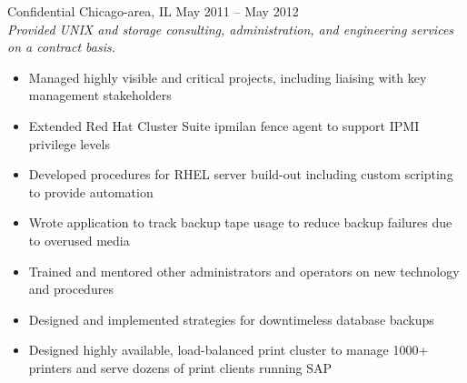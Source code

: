 \documentclass[9pt]{extarticle} %
\begin{document}
\begin{indented}
	Confidential \tab Chicago-area, IL \tab May 2011 -- May 2012\\
	\textit{Provided UNIX and storage consulting, administration, and engineering services on a contract basis.}
	\begin{itemize}
		\item Managed highly visible and critical projects, including liaising with key management stakeholders
		\item Extended Red Hat Cluster Suite ipmilan fence agent to support IPMI privilege levels
		\item Developed procedures for RHEL server build-out including custom scripting to provide automation
		\item Wrote application to track backup tape usage to reduce backup failures due to overused media
		\item Trained and mentored other administrators and operators on new technology and procedures
		\item Designed and implemented strategies for downtimeless database backups
		\item Designed highly available, load-balanced print cluster to manage 1000+ printers and serve dozens of print clients running SAP
	\end{itemize}
\end{indented}

\bigskip


\end{document}
